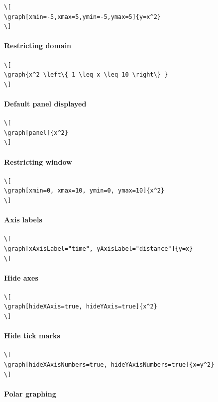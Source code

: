 \documentclass{ximera}
\begin{document}
  
\begin{verbatim}
\[
\graph[xmin=-5,xmax=5,ymin=-5,ymax=5]{y=x^2}
\]
\end{verbatim}
\paragraph{Restricting domain}


\begin{verbatim}
\[
\graph{x^2 \left\{ 1 \leq x \leq 10 \right\} }
\]
\end{verbatim}
\paragraph{Default panel displayed}

  
\begin{verbatim}
\[
\graph[panel]{x^2}
\]
\end{verbatim}
\paragraph{Restricting window}

  
\begin{verbatim}
\[
\graph[xmin=0, xmax=10, ymin=0, ymax=10]{x^2}
\]
\end{verbatim}
\paragraph{Axis labels}

  
\begin{verbatim}
\[
\graph[xAxisLabel="time", yAxisLabel="distance"]{y=x}
\]
\end{verbatim}
\paragraph{Hide axes}

  
\begin{verbatim}
\[
\graph[hideXAxis=true, hideYAxis=true]{x^2}
\]
\end{verbatim}
\paragraph{Hide tick marks}

  
\begin{verbatim}
\[
\graph[hideXAxisNumbers=true, hideYAxisNumbers=true]{x=y^2}
\]
\end{verbatim}
\paragraph{Polar graphing}
\end{document}
